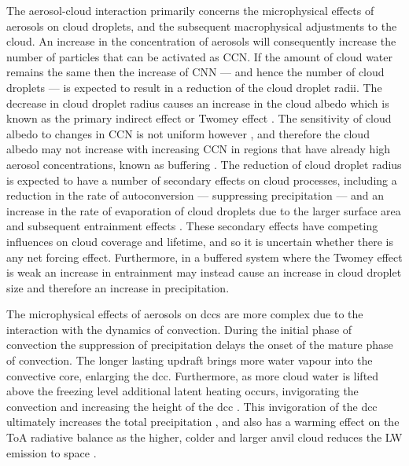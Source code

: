 The aerosol-cloud interaction primarily concerns the microphysical effects of aerosols on cloud droplets, and the subsequent macrophysical adjustments to the cloud.
An increase in the concentration of aerosols will consequently increase the number of particles that can be activated as CCN.
If the amount of cloud water remains the same then the increase of CNN --- and hence the number of cloud droplets --- is expected to result in a reduction of the cloud droplet radii.
The decrease in cloud droplet radius causes an increase in the cloud albedo which is known as the primary indirect effect or Twomey effect \citep{twomey_pollution_1974}.
The sensitivity of cloud albedo to changes in CCN is not uniform however \citep{twomey_aerosols_1991}, and therefore the cloud albedo may not increase with increasing CCN in regions that have already high aerosol concentrations, known as buffering \citep{stevens_untangling_2009}.
The reduction of cloud droplet radius is expected to have a number of secondary effects on cloud processes, including a reduction in the rate of autoconversion --- suppressing precipitation \citep{albrecht_aerosols_1989} --- and an increase in the rate of evaporation of cloud droplets due to the larger surface area and subsequent entrainment effects \citep{ackerman_impact_2004}.
These secondary effects have competing influences on cloud coverage and lifetime, and so it is uncertain whether there is any net forcing effect.
Furthermore, in a buffered system where the Twomey effect is weak an increase in entrainment may instead cause an increase in cloud droplet size \citep{jia_is_2019} and therefore an increase in precipitation.

The microphysical effects of aerosols on \acrshort{dcc}s are more complex due to the interaction with the dynamics of convection.
During the initial phase of convection the suppression of precipitation delays the onset of the mature phase of convection.
The longer lasting updraft brings more water vapour into the convective core, enlarging the \acrshort{dcc}.
Furthermore, as more cloud water is lifted above the freezing level additional latent heating occurs, invigorating the convection and increasing the height of the \acrshort{dcc} \citep{khain2005aerosol}.
This invigoration of the \acrshort{dcc} ultimately increases the total precipitation \citep{koren_aerosol_2005}, and also has a warming effect on the ToA radiative balance as the higher, colder and larger anvil cloud reduces the LW emission to space \citep{rosenfeld_flood_2008,fan_microphysical_2013}.

